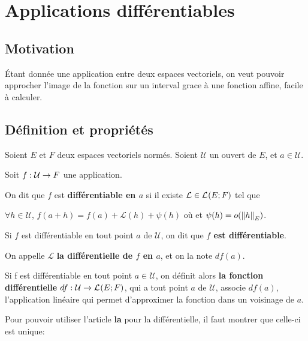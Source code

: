 \chapter{Applications différentiables}
\label{chap:differential}
\section*{Motivation}
	Étant donnée une application entre deux espaces vectoriels, on veut pouvoir
	approcher l'image de la fonction sur un interval grace à une fonction
	affine, facile à calculer.


\section{Définition et propriétés}


\begin{definition} 
\label{a_differential}
	Soient $E$ et $F$ deux espaces vectoriels normés.
	Soient $\mathcal{U}$ un ouvert de $E$, et $a \in \mathcal{U}$.

	Soit $f : \mathcal{U} \rightarrow F$ une application.

	On dit que $f$ est \textbf{différentiable en $a$} si il existe $\mathcal{L}
	\in \mathcal{L}_{}(E; F)$ tel que

	$\forall h \in \mathcal{U}$,
	$f(a + h) = f(a) + \mathcal{L}(h) + \psi(h)$ où
	et $\psi(h) = o(\norm{h}_{E})$.
\end{definition}

\begin{remarque}
	Si $f$ est différentiable en tout point $a$ de $\mathcal{U}$, on dit que
	\textbf{$f$ est différentiable}.
\end{remarque}

On appelle $\mathcal{L}$ \textbf{la différentielle de $f$ en $a$}, et on la note
$df(a)$.

Si f est différentiable en tout point $a \in \mathcal{U}$, on définit alors
\textbf{la fonction différentielle}
$df : \mathcal{U} \rightarrow \mathcal{L}_{}(E; F)$, qui a tout point $a$
de $\mathcal{U}$, associe $df(a)$, l'application linéaire qui permet
d'approximer la fonction dans un voisinage de $a$.

Pour pouvoir utiliser l'article \textbf{la} pour la différentielle, il faut
montrer que celle-ci est unique:

